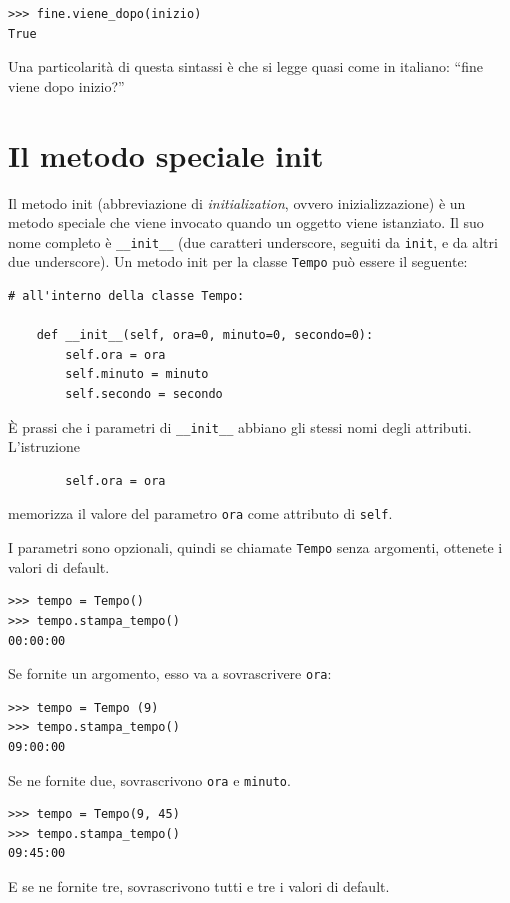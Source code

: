 \documentclass[10pt]{book}
\begin{document}
\begin{verbatim}
>>> fine.viene_dopo(inizio)
True
\end{verbatim}
%
Una particolarità di questa sintassi è che si legge quasi come in italiano:
``fine viene dopo inizio?''


\section{Il metodo speciale init}

Il metodo init (abbreviazione di {\em initialization}, ovvero inizializzazione) è un metodo speciale che viene invocato quando un oggetto viene istanziato. Il suo nome completo è \verb"__init__" (due caratteri underscore, 
seguiti da {\tt init}, e da altri due  underscore). Un metodo init per la classe  {\tt Tempo} può essere il seguente:

\begin{verbatim}
# all'interno della classe Tempo:

    def __init__(self, ora=0, minuto=0, secondo=0):
        self.ora = ora
        self.minuto = minuto
        self.secondo = secondo
\end{verbatim}
%
È prassi che i parametri di \verb"__init__" abbiano gli stessi nomi degli attributi. L'istruzione

\begin{verbatim}
        self.ora = ora
\end{verbatim}
%
memorizza il valore del parametro {\tt ora} come attributo di {\tt self}.

I parametri sono opzionali, quindi se chiamate {\tt Tempo} senza argomenti, ottenete i valori di default.

\begin{verbatim}
>>> tempo = Tempo()
>>> tempo.stampa_tempo()
00:00:00
\end{verbatim}
%
Se fornite un argomento, esso va a sovrascrivere {\tt ora}:

\begin{verbatim}
>>> tempo = Tempo (9)
>>> tempo.stampa_tempo()
09:00:00
\end{verbatim}
%
Se ne fornite due, sovrascrivono {\tt ora} e {\tt minuto}.

\begin{verbatim}
>>> tempo = Tempo(9, 45)
>>> tempo.stampa_tempo()
09:45:00
\end{verbatim}
%
E se ne fornite tre, sovrascrivono tutti e tre i valori di default.
\end{document}
